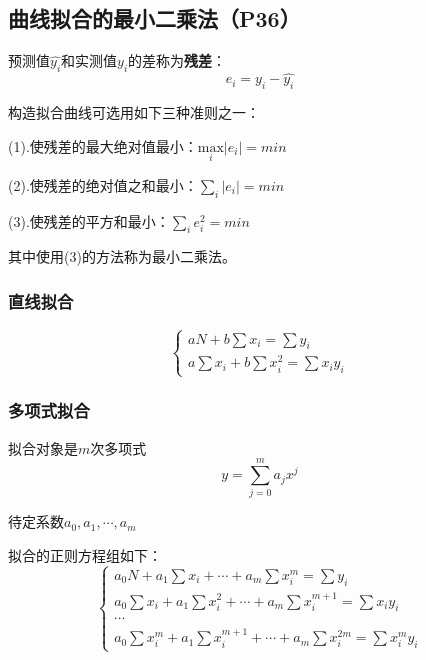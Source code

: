 \documentclass[fontset=ubuntu]{ctexart}
\numberwithin{equation}{section}
\numberwithin{theorem}{section}
\begin{document}
\begin{multicols}{2}
    \subsection{曲线拟合的最小二乘法（P36）}

    预测值$\widehat{y_i}$和实测值$y_i$的差称为\textbf{残差}：
    \begin{equation}
        e_i=y_i-\widehat{y_i}
    \end{equation}

    构造拟合曲线可选用如下三种准则之一：

    (1).使残差的最大绝对值最小：$\underset{i}{\text{max}}\lvert e_i\rvert=min$

    (2).使残差的绝对值之和最小：$\sum_{i}\lvert e_i\rvert=min$

    (3).使残差的平方和最小：$\sum_{i}e_i^2=min$

    其中使用(3)的方法称为最小二乘法。

    \subsubsection{直线拟合}

    \begin{equation}
        \left\{\begin{array}{l}
        aN+b\sum x_i=\sum y_i \\
        a\sum x_i +b\sum x_i^2=\sum x_i y_i
        \end{array}\right.
    \end{equation}

    \subsubsection{多项式拟合}

    拟合对象是$m$次多项式
    \begin{equation}
        y=\sum_{j=0}^{m}a_j x^j
    \end{equation}

    待定系数$a_0,a_1,\cdots,a_m$

    拟合的正则方程组如下：
    \begin{equation}
        \left\{\begin{array}{l}
            a_0N+a_1\sum x_i+\cdots+a_m\sum x_i^m=\sum y_i \\
            a_0\sum x_i+a_1\sum x_i^2+\cdots+a_m\sum x_i^{m+1}=\sum x_i y_i \\
            \cdots \\
            a_0\sum x_i^m +a_1\sum x_i^{m+1}+\cdots+a_m\sum x_i^{2m}=\sum x_i^m y_i
        \end{array}\right.
    \end{equation}



\end{multicols}
\end{document}
